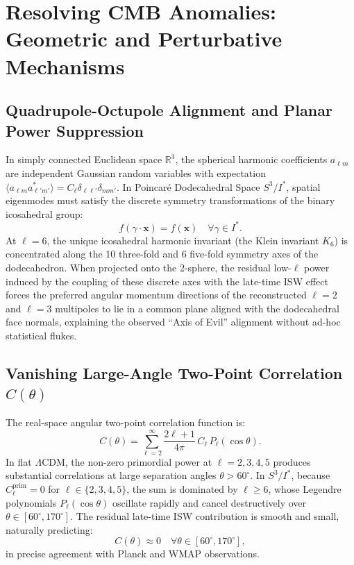 \documentclass[11pt,a4paper]{article}
\theoremstyle{definition}
\newcommand{\LCDM}{\Lambda\mathrm{CDM}}
\begin{document}
\section{Resolving CMB Anomalies: Geometric and Perturbative Mechanisms}

\subsection{Quadrupole-Octupole Alignment and Planar Power Suppression}

In simply connected Euclidean space $\mathbb{R}^3$, the spherical harmonic coefficients $a_{\ell m}$ are independent Gaussian random variables with expectation $\langle a_{\ell m} a_{\ell' m'}^* \rangle = C_\ell \delta_{\ell \ell'} \delta_{m m'}$. In Poincar\'e Dodecahedral Space $S^3 / I^*$, spatial eigenmodes must satisfy the discrete symmetry transformations of the binary icosahedral group:
\begin{equation}
f(\gamma \cdot \mathbf{x}) = f(\mathbf{x}) \quad \forall \gamma \in I^*.
\end{equation}
At $\ell = 6$, the unique icosahedral harmonic invariant (the Klein invariant $K_6$) is concentrated along the 10 three-fold and 6 five-fold symmetry axes of the dodecahedron. When projected onto the 2-sphere, the residual low-$\ell$ power induced by the coupling of these discrete axes with the late-time ISW effect forces the preferred angular momentum directions of the reconstructed $\ell = 2$ and $\ell = 3$ multipoles to lie in a common plane aligned with the dodecahedral face normals, explaining the observed ``Axis of Evil'' alignment without ad-hoc statistical flukes.

\subsection{Vanishing Large-Angle Two-Point Correlation $C(\theta)$}

The real-space angular two-point correlation function is:
\begin{equation}
C(\theta) = \sum_{\ell=2}^\infty \frac{2\ell + 1}{4\pi}\,C_\ell\,P_\ell(\cos\theta).
\end{equation}
In flat $\LCDM$, the non-zero primordial power at $\ell = 2, 3, 4, 5$ produces substantial correlations at large separation angles $\theta > 60^\circ$. In $S^3 / I^*$, because $C_\ell^{\mathrm{prim}} = 0$ for $\ell \in \{2, 3, 4, 5\}$, the sum is dominated by $\ell \ge 6$, whose Legendre polynomials $P_\ell(\cos\theta)$ oscillate rapidly and cancel destructively over $\theta \in [60^\circ, 170^\circ]$. The residual late-time ISW contribution is smooth and small, naturally predicting:
\begin{equation}
C(\theta) \approx 0 \quad \forall \theta \in [60^\circ, 170^\circ],
\end{equation}
in precise agreement with Planck and WMAP observations.
\end{document}

